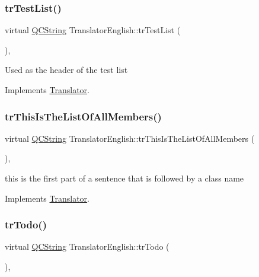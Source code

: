 \subsubsection{\texorpdfstring{trTestList()}{trTestList()}}
{\footnotesize\ttfamily virtual \mbox{\hyperlink{class_q_c_string}{Q\+C\+String}} Translator\+English\+::tr\+Test\+List (\begin{DoxyParamCaption}{ }\end{DoxyParamCaption})\hspace{0.3cm}{\ttfamily [inline]}, {\ttfamily [virtual]}}

Used as the header of the test list 

Implements \mbox{\hyperlink{class_translator}{Translator}}.

\mbox{\label{class_translator_english_aa05138148784a13b6eab787fb947ff69}} 
\subsubsection{\texorpdfstring{trThisIsTheListOfAllMembers()}{trThisIsTheListOfAllMembers()}}
{\footnotesize\ttfamily virtual \mbox{\hyperlink{class_q_c_string}{Q\+C\+String}} Translator\+English\+::tr\+This\+Is\+The\+List\+Of\+All\+Members (\begin{DoxyParamCaption}{ }\end{DoxyParamCaption})\hspace{0.3cm}{\ttfamily [inline]}, {\ttfamily [virtual]}}

this is the first part of a sentence that is followed by a class name 

Implements \mbox{\hyperlink{class_translator}{Translator}}.

\mbox{\label{class_translator_english_a8209d9cc3addcfefc25090105ef94b55}} 
\subsubsection{\texorpdfstring{trTodo()}{trTodo()}}
{\footnotesize\ttfamily virtual \mbox{\hyperlink{class_q_c_string}{Q\+C\+String}} Translator\+English\+::tr\+Todo (\begin{DoxyParamCaption}{ }\end{DoxyParamCaption})\hspace{0.3cm}{\ttfamily [inline]}, {\ttfamily [virtual]}}

